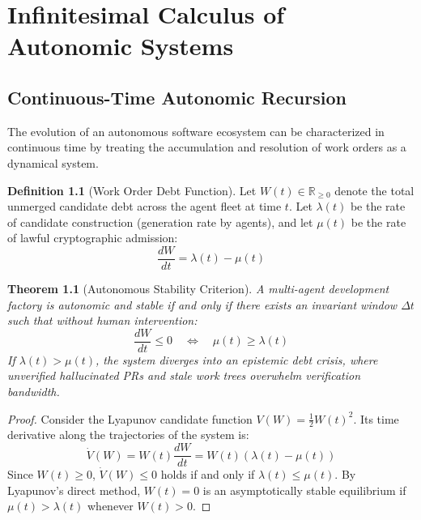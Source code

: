 \documentclass[11pt,twoside,openright]{report}
\theoremstyle{definition}
\newtheorem{definition}{Definition}[chapter]
\theoremstyle{plain}
\newtheorem{theorem}{Theorem}[chapter]
\theoremstyle{remark}
\newcommand{\Rspace}{\mathbb{R}}
\begin{document}
\chapter{Infinitesimal Calculus of Autonomic Systems}
\label{ch:calculus}

\section{Continuous-Time Autonomic Recursion}
The evolution of an autonomous software ecosystem can be characterized in continuous time by treating the accumulation and resolution of work orders as a dynamical system.

\begin{definition}[Work Order Debt Function]
Let $W(t) \in \Rspace_{\ge 0}$ denote the total unmerged candidate debt across the agent fleet at time $t$. Let $\lambda(t)$ be the rate of candidate construction (generation rate by agents), and let $\mu(t)$ be the rate of lawful cryptographic admission:
\begin{equation}
\frac{dW}{dt} = \lambda(t) - \mu(t)
\end{equation}
\end{definition}

\begin{theorem}[Autonomous Stability Criterion]
A multi-agent development factory is autonomic and stable if and only if there exists an invariant window $\Delta t$ such that without human intervention:
\begin{equation}
\frac{dW}{dt} \le 0 \quad \iff \quad \mu(t) \ge \lambda(t)
\end{equation}
If $\lambda(t) > \mu(t)$, the system diverges into an epistemic debt crisis, where unverified hallucinated PRs and stale work trees overwhelm verification bandwidth.
\end{theorem}

\begin{proof}
Consider the Lyapunov candidate function $V(W) = \frac{1}{2} W(t)^2$. Its time derivative along the trajectories of the system is:
\[
\dot{V}(W) = W(t) \frac{dW}{dt} = W(t) (\lambda(t) - \mu(t))
\]
Since $W(t) \ge 0$, $\dot{V}(W) \le 0$ holds if and only if $\lambda(t) \le \mu(t)$. By Lyapunov's direct method, $W(t) = 0$ is an asymptotically stable equilibrium if $\mu(t) > \lambda(t)$ whenever $W(t) > 0$.
\end{proof}
\end{document}
